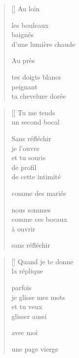 \documentclass[11pt,a4paper]{book}
\begin{document}
\newpage


\settowidth{\versewidth}{d'une lumière chaude}

\bigskip

\begin{verse}[\versewidth]
  Au loin

  les bouleaux \\
  baignés \\
  d'une lumière chaude

  Au près

  tes doigts blancs \\
  peignant \\
  ta chevelure dorée
\end{verse}

\newpage


\settowidth{\versewidth}{de cette intimité}

\bigskip

\begin{verse}[\versewidth]
  Tu me tends \\
  un second bocal

  Sans réfléchir \\
  je l'ouvre \\
  et tu souris \\
  de profil \\
  de cette intimité

  comme des mariés

  nous sommes \\
  comme ces bocaux \\
  à ouvrir

  sans réfléchir
\end{verse}

\newpage


\settowidth{\versewidth}{je glisse mes mots}

\bigskip

\begin{verse}[\versewidth]
  Quand je te donne \\
  la réplique

  parfois \\
  je glisse mes mots \\
  et tu veux \\
  glisser aussi

  avec moi

  une page vierge
\end{verse}
\end{document}
